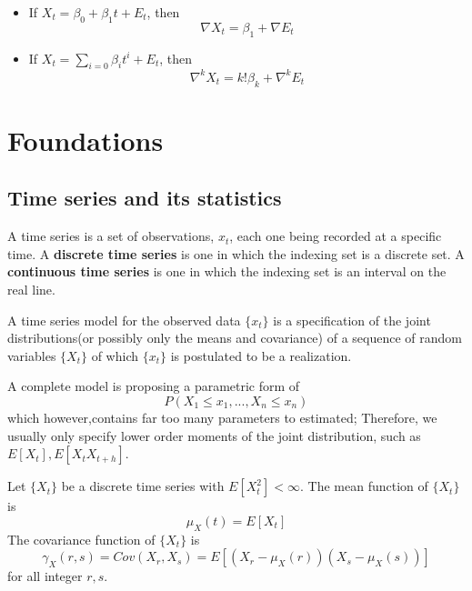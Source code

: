 \begin{example} 
\begin{itemize}
    \item If $X_t = \beta_0 + \beta_1 t + E_t$, then
    $$\nabla X_t = \beta_1 + \nabla E_t$$
    \item If $X_t = \sum_{i=0}\beta_i t^i + E_t$, then
    $$\nabla^k X_t = k! \beta_k + \nabla^k E_t$$
\end{itemize}
\end{example}

\section{Foundations}
\subsection{Time series and its statistics}
\begin{definition}
\cite[1]{brockwell2002introduction}
A time series is a set of observations, $x_t$, each one being recorded at a specific time. A \textbf{discrete time series} is one in which the indexing set is a discrete set. A \textbf{continuous time series} is one in which the indexing set is an interval on the real line. 
\end{definition}

\begin{definition}
\cite[7]{brockwell2002introduction} A time series model for the observed data $\{x_t\}$ is a specification of the joint distributions(or possibly only the means and covariance) of a sequence of random variables $\{X_t\}$ of which $\{x_t\}$ is postulated to be a realization.
\end{definition}

\begin{remark}
A complete model is proposing a parametric form of 
$$P(X_1\leq x_1,...,X_n\leq x_n)$$
which however,contains far too many parameters to estimated; Therefore, we usually only specify lower order moments of the joint distribution, such as $E[X_t],E[X_tX_{t+h}]$.
\end{remark}

\begin{definition}
Let $\{X_t\}$ be a discrete time series with $E[X_t^2] < \infty$. The mean function of $\{X_t\}$ is $$\mu_X(t) = E[X_t]$$
The covariance function of $\{X_t\}$ is
$$\gamma_X(r,s) = Cov(X_r,X_s) = E[(X_r-\mu_X(r))(X_s-\mu_X(s))]$$
for all integer $r,s$.
\end{definition}


